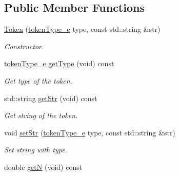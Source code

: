 \subsection*{Public Member Functions}
\begin{DoxyCompactItemize}
\item 
\hyperlink{class_token_ad84c27d6c4587fd359ffa52004bd370b}{Token} (\hyperlink{class_token_a706d105bff3282a406a9b218fcee1bfc}{token\+Type\+\_\+e} type, const std\+::string \&str)
\begin{DoxyCompactList}\small\item\em Constructor. \end{DoxyCompactList}\item 
\hypertarget{class_token_a1e326d33b7212772f3785fac4c3662be}{}\hyperlink{class_token_a706d105bff3282a406a9b218fcee1bfc}{token\+Type\+\_\+e} \hyperlink{class_token_a1e326d33b7212772f3785fac4c3662be}{get\+Type} (void) const \label{class_token_a1e326d33b7212772f3785fac4c3662be}

\begin{DoxyCompactList}\small\item\em Get type of the token. \end{DoxyCompactList}\item 
\hypertarget{class_token_ad38a4d20573a9c6c4bc2447a4701b51d}{}std\+::string \hyperlink{class_token_ad38a4d20573a9c6c4bc2447a4701b51d}{get\+Str} (void) const \label{class_token_ad38a4d20573a9c6c4bc2447a4701b51d}

\begin{DoxyCompactList}\small\item\em Get string of the token. \end{DoxyCompactList}\item 
\hypertarget{class_token_a5fbdba95469bc2afbaedf161e86d6d94}{}void \hyperlink{class_token_a5fbdba95469bc2afbaedf161e86d6d94}{set\+Str} (\hyperlink{class_token_a706d105bff3282a406a9b218fcee1bfc}{token\+Type\+\_\+e} type, const std\+::string \&str)\label{class_token_a5fbdba95469bc2afbaedf161e86d6d94}

\begin{DoxyCompactList}\small\item\em Set string with type. \end{DoxyCompactList}\item 
\hypertarget{class_token_a2d5c2dc14215b3b443b3ba16d12a49aa}{}double \hyperlink{class_token_a2d5c2dc14215b3b443b3ba16d12a49aa}{get\+N} (void) const \label{class_token_a2d5c2dc14215b3b443b3ba16d12a49aa}


\end{DoxyCompactItemize}
